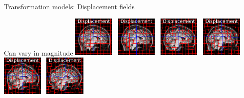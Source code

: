 \documentclass{beamer}
\begin{document}
\begin{frame}{Transformation models: Displacement fields}


Can vary in magnitude
\includegraphics[width=0.15\textwidth]{tform_models_disp_4_1}~
\includegraphics[width=0.15\textwidth]{tform_models_disp_4_2}~
\includegraphics[width=0.15\textwidth]{tform_models_disp_4_3}~
\includegraphics[width=0.15\textwidth]{tform_models_disp_4_4}~
\includegraphics[width=0.15\textwidth]{tform_models_disp_4_5}~
\includegraphics[width=0.15\textwidth]{tform_models_disp_4_6}




\end{frame}
\end{document}
